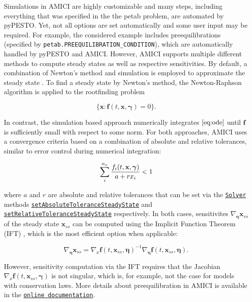 \documentclass[11pt]{article}
\begin{document}
    Simulations in AMICI are highly customizable and many steps, including
everything that was specified in the the petab problem, are automated by
pyPESTO. Yet, not all options are set automatically and some user input
may be required. For example, the considered example includes
preequilibrations (specified by
\texttt{petab.PREEQUILIBRATION\_CONDITION}), which are automatically
handled by pyPESTO and AMICI. However, AMICI supports multiple different
methods to compute steady states as well as respective sensitivities. By
default, a combination of Newton's method and simulation is employed to
approximate the steady state \cite{2754712/LVNQBT95}. To find a steady
state by Newton's method, the Newton-Raphson algorithm is applied to the
rootfinding problem

\[ \{\textbf{x}: \textbf{f}(t,\textbf{x},\boldsymbol{\gamma}) = 0\}. \]

In contrast, the simulation based approach numerically integrates
\(\eqref{eq:ode}\) until \(\textbf{f}\) is sufficiently small with
respect to some norm. For both approaches, AMICI uses a convergence
criteria based on a combination of absolute and relative tolerances,
similar to error control during numerical integration:

\[ \sum_i^{{n_{x}}} \frac{f_i(t,\textbf{x},\boldsymbol{\gamma})}{a + r x_i} < 1\]

where \(a\) and \(r\) are absolute and relative tolerances that can be
set via the
\href{https://amici.readthedocs.io/en/latest/generated/amici.amici.Solver.html\#amici.amici.Solver}{\texttt{Solver}}
methods
\href{https://amici.readthedocs.io/en/latest/generated/amici.amici.Solver.html\#amici.amici.Solver.setAbsoluteToleranceSteadyState}{\texttt{setAbsoluteToleranceSteadyState}}
and
\href{https://amici.readthedocs.io/en/latest/generated/amici.amici.Solver.html\#amici.amici.Solver.setRelativeToleranceSteadyState}{\texttt{setRelativeToleranceSteadyState}}
respectively. In both cases, sensitivites
\(\nabla_{\boldsymbol{\eta}}\textbf{x}_{ss}\) of the steady state
\(\textbf{x}_{ss}\) can be computed using the Implicit Function Theorem
(IFT) \cite{2754712/6AWGLSM9}, which is the most efficient option when
applicable:

\[ \nabla_{\boldsymbol{\eta}}\textbf{x}_{ss} = \nabla_x\textbf{f}(t,\textbf{x}_{ss},\boldsymbol{\eta})^{-1}\nabla_{\boldsymbol{\eta}}\textbf{f}(t,\textbf{x}_{ss},\boldsymbol{\eta}) . \]

However, sensitivity computation via the IFT requires that the Jacobian
\(\nabla_x\textbf{f}(t,\textbf{x}_{ss},\boldsymbol{\gamma})\) is not
singular, which is, for example, not the case for models with
conservation laws. More details about preequilibration in AMICI is
available in the
\href{https://amici.readthedocs.io/en/latest/ExampleEquilibrationLogic.html}{\texttt{online\ documentation}}.
\end{document}
